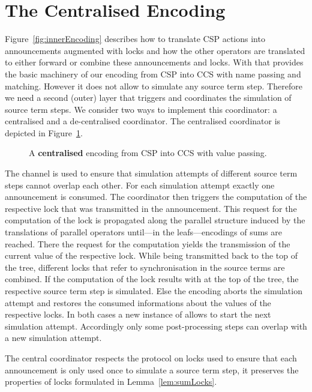 \documentclass[]{eptcs}
\begin{document}
\section{The Centralised Encoding}
\label{sec:central}

Figure~\ref{fig:innerEncoding} describes how to translate CSP actions into announcements augmented with locks and how the other operators are translated to either forward or combine these announcements and locks. With that  provides the basic machinery of our encoding from CSP into CCS with name passing and matching. However it does not allow to simulate any source term step. Therefore we need a second (outer) layer that triggers and coordinates the simulation of source term steps. We consider two ways to implement this coordinator: a centralised and a de-centralised coordinator. The centralised coordinator is depicted in Figure~\ref{fig:centralised}.

\begin{figure}
	
	\caption{A \textbf{centralised} encoding from CSP into CCS with value passing.}
	\label{fig:centralised}
\end{figure}

The channel  is used to ensure that simulation attempts of different source term steps cannot overlap each other. For each simulation attempt exactly one announcement is consumed. The coordinator then triggers the computation of the respective lock that was transmitted in the announcement. This request for the computation of the lock is propagated along the parallel structure induced by the translations of parallel operators until---in the leafs---encodings of sums are reached. There the request for the computation yields the transmission of the current value of the respective lock. While being transmitted back to the top of the tree, different locks that refer to synchronisation in the source terms are combined. If the computation of the lock results with  at the top of the tree, the respective source term step is simulated. Else the encoding aborts the simulation attempt and restores the consumed informations about the values of the respective locks. In both cases a new instance of  allows to start the next simulation attempt. Accordingly only some post-processing steps can overlap with a new simulation attempt.

The central coordinator respects the protocol on locks used to ensure that each announcement is only used once to simulate a source term step, \ie it preserves the properties of locks formulated in Lemma~\ref{lem:sumLocks}.
\end{document}
